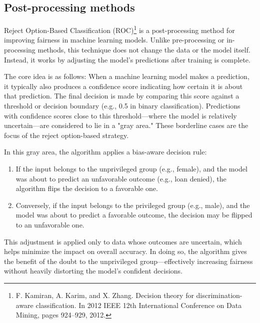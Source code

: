 \subsection{Post-processing methods}
Reject Option-Based Classification (ROC)\footnote{F. Kamiran, A. Karim, and X. Zhang. Decision theory for discrimination-aware classification. In 2012 IEEE 12th International Conference on Data Mining, pages 924–929, 2012.} is a post-processing method for improving fairness in machine learning models. Unlike pre-processing or in-processing methods, this technique does not change the data or the model itself. Instead, it works by adjusting the model’s predictions after training is complete.
\par The core idea is as follows: When a machine learning model makes a prediction, it typically also produces a confidence score indicating how certain it is about that prediction. The final decision is made by comparing this score against a threshold or decision boundary (e.g., 0.5 in binary classification). Predictions with confidence scores close to this threshold—where the model is relatively uncertain—are considered to lie in a "gray area." These borderline cases are the focus of the reject option-based strategy.
\par In this gray area, the algorithm applies a bias-aware decision rule: 
\begin{enumerate}
\item If the input belongs to the unprivileged group (e.g., female), and the model was about to predict an unfavorable outcome (e.g., loan denied), the algorithm flips the decision to a favorable one.
\item Conversely, if the input belongs to the privileged group (e.g., male), and the model was about to predict a favorable outcome, the decision may be flipped to an unfavorable one.
\end{enumerate}
\par This adjustment is applied only to data whose outcomes are uncertain, which helps minimize the impact on overall accuracy. In doing so, the algorithm gives the benefit of the doubt to the unprivileged group—effectively increasing fairness without heavily distorting the model’s confident decisions.


\begin{VCSet}
    \begin{visualComponent}
    \end{visualComponent}
    
    \begin{visualComponent}
    \end{visualComponent}
\end{VCSet}
